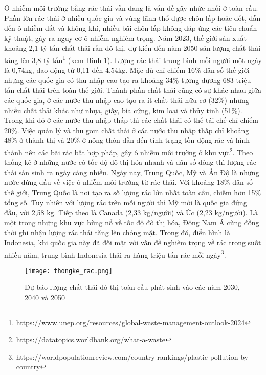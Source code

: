 \documentclass[../the.tex]{subfiles}
\begin{document}
{\fontsize{13}{12} \selectfont

Ô nhiễm môi trường bằng rác thải vẫn đang là vấn đề gây nhức nhối ở toàn cầu.
Phần lớn rác thải ở nhiều quốc gia và vùng lãnh thổ được chôn lấp hoặc đốt, dẫn đến ô nhiễm đất và không khí, nhiều bãi chôn lấp không đáp ứng các tiêu chuẩn kỹ thuật, gây ra nguy cơ ô nhiễm nghiêm trọng.
Năm 2023, thế giới sản xuất khoảng 2,1 tỷ tấn chất thải rắn đô thị, dự kiến đến năm 2050 sản lượng chất thải tăng lên 3,8 tỷ tấn\footnote[1]{https://www.unep.org/resources/global-waste-management-outlook-2024} (xem Hình \ref{fig:thongke_rac}).
Lượng rác thải trung bình mỗi người một ngày là 0,74kg, dao động từ 0,11 đến 4,54kg. Mặc dù chỉ chiếm 16\% dân số thế giới nhưng các quốc gia có thu nhập cao tạo ra khoảng 34\% tương đương 683 triệu tấn chất thải trên toàn thế giới.
Thành phần chất thải cũng có sự khác nhau giữa các quốc gia, ở các nước thu nhập cao tạo ra ít chất thải hữu cơ (32\%) nhưng nhiều chất thải khác như nhựa, giấy, bìa cứng, kim loại và thủy tinh (51\%). Trong khi đó ở các nước thu nhập thấp thì các chất thải có thể tái chế chỉ chiếm 20\%.
Việc quản lý và thu gom chất thải ở các nước thu nhập thấp chỉ khoảng 48\% ở thành thị và 20\% ở nông thôn dẫn đến tình trạng tồn động rác và hình thành nên các bãi rác bất hợp pháp, gây ô nhiễm môi trường ở khu vực\footnote[2]{https://datatopics.worldbank.org/what-a-waste}. 
Theo thống kê ở những nước có tốc độ đô thị hóa nhanh và dân số đông thì lượng rác thải sản sinh ra ngày càng nhiều. Ngày nay, Trung Quốc, Mỹ và Ấn Độ là những nước đứng đầu về việc ô nhiễm môi trường từ rác thải.
Với khoảng 18\% dân số thế giới, Trung Quốc là nơi tạo ra số lượng rác lớn nhất toàn cầu, chiếm hơn 15\% tổng số. Tuy nhiên với lượng rác trên mỗi người thì Mỹ mới là quốc gia đứng đầu, với 2,58 kg. Tiếp theo là Canada (2,33 kg/người) và Úc (2,23 kg/người).
Là một trong những khu vực bùng nổ về tốc độ đô thị hóa, Đông Nam Á cũng đồng thời ghi nhận lượng rác thải tăng lên chóng mặt.
Trong đó, điển hình là Indonesia, khi quốc gia này đã đối mặt với vấn đề nghiêm trọng về rác trong suốt nhiều năm, trung bình Indonesia thải ra hàng triệu tấn rác mỗi ngày\footnote[3]{https://worldpopulationreview.com/country-rankings/plastic-pollution-by-country}.
}

\begin{figure}[H]
	\centering
	\texttt{[image: thongke\_rac.png]}
	\caption{Dự báo lượng chất thải đô thị toàn cầu phát sinh vào các năm 2030, 2040 và 2050}
	\label{fig:thongke_rac}
\end{figure}
\end{document}
